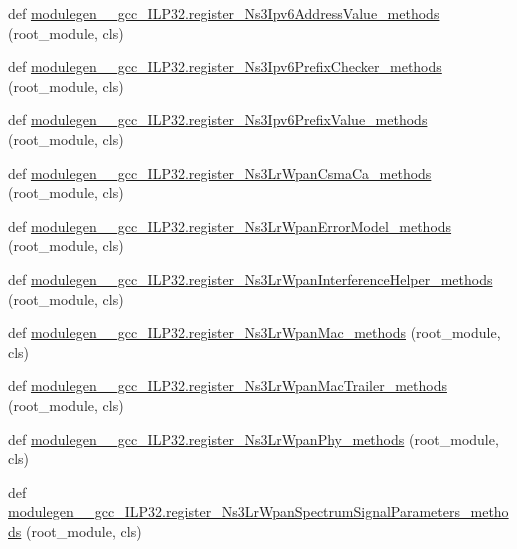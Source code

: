 \begin{DoxyCompactItemize}
\item 
def \hyperlink{namespacemodulegen____gcc__ILP32_a94efe88582382700df8f33c69780357b}{modulegen\+\_\+\+\_\+gcc\+\_\+\+I\+L\+P32.\+register\+\_\+\+Ns3\+Ipv6\+Address\+Value\+\_\+methods} (root\+\_\+module, cls)
\item 
def \hyperlink{namespacemodulegen____gcc__ILP32_a98ee840f5ce1609ca10ebe6eb1022047}{modulegen\+\_\+\+\_\+gcc\+\_\+\+I\+L\+P32.\+register\+\_\+\+Ns3\+Ipv6\+Prefix\+Checker\+\_\+methods} (root\+\_\+module, cls)
\item 
def \hyperlink{namespacemodulegen____gcc__ILP32_a0b720f36ae3a4e1b9a79eba05de63e4a}{modulegen\+\_\+\+\_\+gcc\+\_\+\+I\+L\+P32.\+register\+\_\+\+Ns3\+Ipv6\+Prefix\+Value\+\_\+methods} (root\+\_\+module, cls)
\item 
def \hyperlink{namespacemodulegen____gcc__ILP32_a5838642371909e89e4b4ebb13b2d2f79}{modulegen\+\_\+\+\_\+gcc\+\_\+\+I\+L\+P32.\+register\+\_\+\+Ns3\+Lr\+Wpan\+Csma\+Ca\+\_\+methods} (root\+\_\+module, cls)
\item 
def \hyperlink{namespacemodulegen____gcc__ILP32_a9bcd87a1e8e6b4ade70f89eb1d9d5447}{modulegen\+\_\+\+\_\+gcc\+\_\+\+I\+L\+P32.\+register\+\_\+\+Ns3\+Lr\+Wpan\+Error\+Model\+\_\+methods} (root\+\_\+module, cls)
\item 
def \hyperlink{namespacemodulegen____gcc__ILP32_afabb23ab174944d833e377f8dac41b5e}{modulegen\+\_\+\+\_\+gcc\+\_\+\+I\+L\+P32.\+register\+\_\+\+Ns3\+Lr\+Wpan\+Interference\+Helper\+\_\+methods} (root\+\_\+module, cls)
\item 
def \hyperlink{namespacemodulegen____gcc__ILP32_a2074fe7c1426a35c2feb1a17f5000a8b}{modulegen\+\_\+\+\_\+gcc\+\_\+\+I\+L\+P32.\+register\+\_\+\+Ns3\+Lr\+Wpan\+Mac\+\_\+methods} (root\+\_\+module, cls)
\item 
def \hyperlink{namespacemodulegen____gcc__ILP32_ae83ac0bd651197d3bc1cf8578d8819d0}{modulegen\+\_\+\+\_\+gcc\+\_\+\+I\+L\+P32.\+register\+\_\+\+Ns3\+Lr\+Wpan\+Mac\+Trailer\+\_\+methods} (root\+\_\+module, cls)
\item 
def \hyperlink{namespacemodulegen____gcc__ILP32_a94e694821baab0521eda296a5a93d787}{modulegen\+\_\+\+\_\+gcc\+\_\+\+I\+L\+P32.\+register\+\_\+\+Ns3\+Lr\+Wpan\+Phy\+\_\+methods} (root\+\_\+module, cls)
\item 
def \hyperlink{namespacemodulegen____gcc__ILP32_a07a72291179fabaaeb4bb1fdd3015fa4}{modulegen\+\_\+\+\_\+gcc\+\_\+\+I\+L\+P32.\+register\+\_\+\+Ns3\+Lr\+Wpan\+Spectrum\+Signal\+Parameters\+\_\+methods} (root\+\_\+module, cls)
\item 

\end{DoxyCompactItemize}
